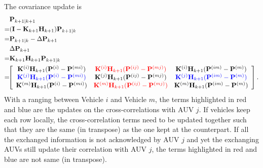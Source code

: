 The covariance update is
\begin{align}
\begin{split}
&{\bf P}_{k+1|k+1} \\
=&({\bf I}-{\bf K}_{k+1}{\bf H}_{k+1}){\bf P}_{k+1|k}\\
=&{\bf P}_{k+1|k}-\Delta{\bf P}_{k+1} \\
&\Delta {\bf P}_{k+1} \\
=&{\bf K}_{k+1}{\bf H}_{k+1}{\bf P}_{k+1|k}\\
=&\!\!\left[
              \begin{array}{ccc}
                {\bf K}^{(i)}{\bf H}_{k+1}({\bf P}^{(i)}-{\bf P}^{(mi)}) & \textcolor[rgb]{1.00,0.00,0.00}{{\bf K}^{(i)}{\bf H}_{k+1}({\bf P}^{(ij)}-{\bf P}^{(mj)})} & {\bf K}^{(i)}{\bf H}_{k+1}({\bf P}^{(im)}-{\bf P}^{(m)}) \\
                \textcolor[rgb]{0.00,0.00,1.00}{{\bf K}^{(j)}{\bf H}_{k+1}({\bf P}^{(i)}-{\bf P}^{(mi)})} & {{\bf K}^{(j)}{\bf H}_{k+1}({\bf P}^{(ij)}-{\bf P}^{(mj)})} & \textcolor[rgb]{0.00,0.00,1.00}{{\bf K}^{(j)}{\bf H}_{k+1}({\bf P}^{(im)}-{\bf P}^{(m)})}\\
                {\bf K}^{(m)}{\bf H}_{k+1}({\bf P}^{(i)}-{\bf P}^{(mi)}) & \textcolor[rgb]{1.00,0.00,0.00}{{\bf K}^{(m)}{\bf H}_{k+1}({\bf P}^{(ij)}-{\bf P}^{(mj)})} & {\bf K}^{(m)}{\bf H}_{k+1}({\bf P}^{(im)}-{\bf P}^{(m)})\\
              \end{array}
            \right]. \\
\end{split}
\label{eq:AUV3update}
\end{align}
With a ranging between Vehicle $i$ and Vehicle $m$, the terms highlighted in red and blue are the updates on the cross-correlations with AUV $j$. If vehicles keep each row locally, the cross-correlation terms need to be updated together such that they are the same (in transpose) as the one kept at the counterpart. If all the exchanged information is not acknowledged by AUV $j$ and yet the exchanging AUVs still update their correlation with AUV $j$, the terms highlighted in red and blue are not same (in transpose). 

